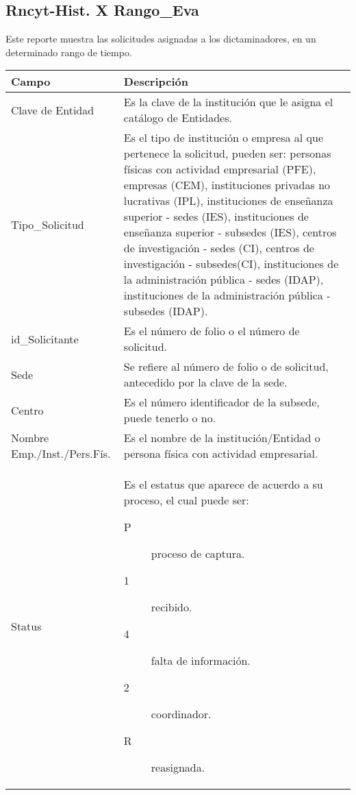 \newpage
\subsection{Rncyt-Hist. X Rango\_Eva}
\label{appendix:Reportes:PeopleSoft:RncytHistRangoEva}

Este reporte muestra las solicitudes asignadas a los dictaminadores, en un determinado rango de tiempo.\\

\begin{tabular}{ m{} m{}  }%
	\rowcolor{gray1} {\bf Campo} &  {\bf Descripción} \\ \hline \hline

	Clave de Entidad & Es la clave de la institución que le asigna el catálogo de Entidades.\\
	\rowcolor{gray1}Tipo\_Solicitud & Es el tipo de institución o empresa al que pertenece la solicitud, pueden ser: personas físicas con actividad empresarial (PFE), empresas (CEM), instituciones privadas no lucrativas (IPL), instituciones de enseñanza superior - sedes (IES), instituciones de enseñanza superior - subsedes (IES), centros de investigación - sedes (CI), centros de investigación - subsedes(CI), instituciones de la administración pública - sedes (IDAP), instituciones de la administración pública - subsedes (IDAP).\\
	id\_Solicitante & Es el número de folio o el número de solicitud.\\
	\rowcolor{gray1}Sede & Se refiere al número de folio o de solicitud, antecedido por la clave de la sede.\\
	Centro & Es el número identificador de la subsede, puede tenerlo o no.\\
	\rowcolor{gray1}Nombre Emp./Inst./Pers.Fís. & Es el nombre de la institución/Entidad o persona física con actividad empresarial.\\
	Status & Es el estatus que aparece de acuerdo a su proceso, el cual puede ser:
               \begin{description}
                    \item[P] proceso de captura.
                    \item[1] recibido.
                    \item[4] falta de información.
                    \item[2] coordinador.
                    \item[R] reasignada.

\end{description}
\end{tabular}
